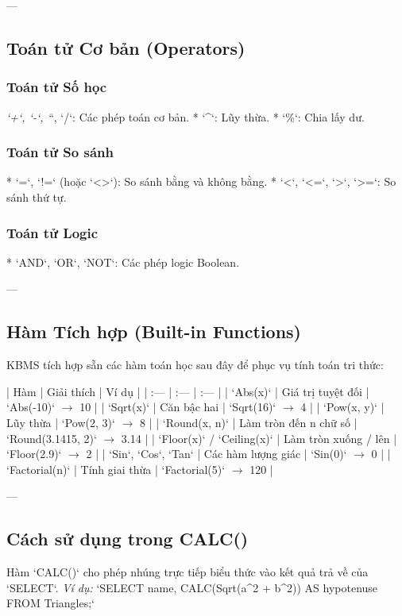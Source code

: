 ---

\subsection{Toán tử Cơ bản (Operators)}

\subsubsection{Toán tử Số học}
\textit{   `+`, `-`, `}`, `/`: Các phép toán cơ bản.
*   `^`: Lũy thừa.
*   `\%`: Chia lấy dư.

\subsubsection{Toán tử So sánh}
*   `=`, `!=` (hoặc `<>`): So sánh bằng và không bằng.
*   `<`, `<=`, `>`, `>=`: So sánh thứ tự.

\subsubsection{Toán tử Logic}
*   `AND`, `OR`, `NOT`: Các phép logic Boolean.

---

\subsection{Hàm Tích hợp (Built-in Functions)}

KBMS tích hợp sẵn các hàm toán học sau đây để phục vụ tính toán tri thức:

| Hàm | Giải thích | Ví dụ |
| :--- | :--- | :--- |
| `Abs(x)` | Giá trị tuyệt đối | `Abs(-10)` $\rightarrow$ 10 |
| `Sqrt(x)` | Căn bậc hai | `Sqrt(16)` $\rightarrow$ 4 |
| `Pow(x, y)` | Lũy thừa | `Pow(2, 3)` $\rightarrow$ 8 |
| `Round(x, n)` | Làm tròn đến n chữ số | `Round(3.1415, 2)` $\rightarrow$ 3.14 |
| `Floor(x)` / `Ceiling(x)` | Làm tròn xuống / lên | `Floor(2.9)` $\rightarrow$ 2 |
| `Sin`, `Cos`, `Tan` | Các hàm lượng giác | `Sin(0)` $\rightarrow$ 0 |
| `Factorial(n)` | Tính giai thừa | `Factorial(5)` $\rightarrow$ 120 |

---

\subsection{Cách sử dụng trong CALC()}

Hàm `CALC()` cho phép nhúng trực tiếp biểu thức vào kết quả trả về của `SELECT`.
\textit{Ví dụ:} `SELECT name, CALC(Sqrt(a^2 + b^2)) AS hypotenuse FROM Triangles;`

